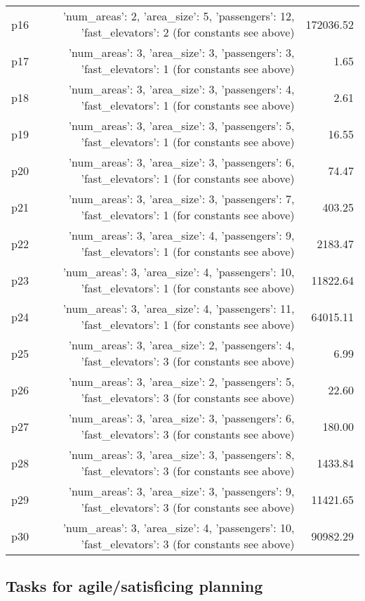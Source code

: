 \documentclass{article}
\begin{document}
\begin{center}
\begin{tabular}{@{}l|r|r@{}}
  p16&{'num\_areas': 2, 'area\_size': 5, 'passengers': 12, 'fast\_elevators': 2 (for constants see above)}&172036.52\\
  p17&{'num\_areas': 3, 'area\_size': 3, 'passengers': 3, 'fast\_elevators': 1 (for constants see above)}&1.65\\
  p18&{'num\_areas': 3, 'area\_size': 3, 'passengers': 4, 'fast\_elevators': 1 (for constants see above)}&2.61\\
  p19&{'num\_areas': 3, 'area\_size': 3, 'passengers': 5, 'fast\_elevators': 1 (for constants see above)}&16.55\\
  p20&{'num\_areas': 3, 'area\_size': 3, 'passengers': 6, 'fast\_elevators': 1 (for constants see above)}&74.47\\
  p21&{'num\_areas': 3, 'area\_size': 3, 'passengers': 7, 'fast\_elevators': 1 (for constants see above)}&403.25\\
  p22&{'num\_areas': 3, 'area\_size': 4, 'passengers': 9, 'fast\_elevators': 1 (for constants see above)}&2183.47\\
  p23&{'num\_areas': 3, 'area\_size': 4, 'passengers': 10, 'fast\_elevators': 1 (for constants see above)}&11822.64\\
  p24&{'num\_areas': 3, 'area\_size': 4, 'passengers': 11, 'fast\_elevators': 1 (for constants see above)}&64015.11\\
  p25&{'num\_areas': 3, 'area\_size': 2, 'passengers': 4, 'fast\_elevators': 3 (for constants see above)}&6.99\\
  p26&{'num\_areas': 3, 'area\_size': 2, 'passengers': 5, 'fast\_elevators': 3 (for constants see above)}&22.60\\
  p27&{'num\_areas': 3, 'area\_size': 3, 'passengers': 6, 'fast\_elevators': 3 (for constants see above)}&180.00\\
  p28&{'num\_areas': 3, 'area\_size': 3, 'passengers': 8, 'fast\_elevators': 3 (for constants see above)}&1433.84\\
  p29&{'num\_areas': 3, 'area\_size': 3, 'passengers': 9, 'fast\_elevators': 3 (for constants see above)}&11421.65\\
  p30&{'num\_areas': 3, 'area\_size': 4, 'passengers': 10, 'fast\_elevators': 3 (for constants see above)}&90982.29
                            \end{tabular}
                            \end{center}
                    

                                \subsection*{Tasks for agile/satisficing planning}
                                
\end{document}
